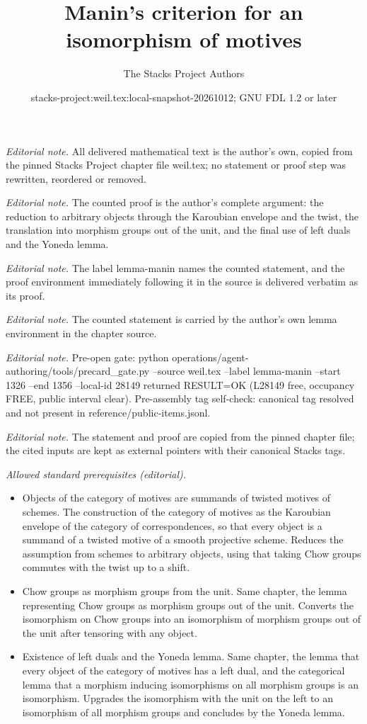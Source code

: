 \documentclass[10pt,a4paper]{amsart}
\title{Manin's criterion for an isomorphism of motives}
\author{The Stacks Project Authors}
\date{stacks-project:weil.tex:local-snapshot-20261012; GNU FDL 1.2 or later}
\theoremstyle{plain}
\theoremstyle{definition}
\theoremstyle{remark}
\numberwithin{equation}{subsection}
\begin{document}
\maketitle
\noindent\textit{Editorial note.} All delivered mathematical text is the author's own, copied from the pinned Stacks Project chapter file weil.tex; no statement or proof step was rewritten, reordered or removed.\par\medskip
\noindent\textit{Editorial note.} The counted proof is the author's complete argument: the reduction to arbitrary objects through the Karoubian envelope and the twist, the translation into morphism groups out of the unit, and the final use of left duals and the Yoneda lemma.\par\medskip
\noindent\textit{Editorial note.} The label lemma-manin names the counted statement, and the proof environment immediately following it in the source is delivered verbatim as its proof.\par\medskip
\noindent\textit{Editorial note.} The counted statement is carried by the author's own lemma environment in the chapter source.\par\medskip
\noindent\textit{Editorial note.} Pre-open gate: python operations/agent-authoring/tools/precard\_gate.py --source weil.tex --label lemma-manin --start 1326 --end 1356 --local-id 28149 returned RESULT=OK (L28149 free, occupancy FREE, public interval clear). Pre-assembly tag self-check: canonical tag resolved and not present in reference/public-items.jsonl.\par\medskip
\noindent\textit{Editorial note.} The statement and proof are copied from the pinned chapter file; the cited inputs are kept as external pointers with their canonical Stacks tags.\par\medskip
\noindent\textit{Allowed standard prerequisites (editorial).}\begin{itemize}
\item Objects of the category of motives are summands of twisted motives of schemes. The construction of the category of motives as the Karoubian envelope of the category of correspondences, so that every object is a summand of a twisted motive of a smooth projective scheme. Reduces the assumption from schemes to arbitrary objects, using that taking Chow groups commutes with the twist up to a shift.
\item Chow groups as morphism groups from the unit. Same chapter, the lemma representing Chow groups as morphism groups out of the unit. Converts the isomorphism on Chow groups into an isomorphism of morphism groups out of the unit after tensoring with any object.
\item Existence of left duals and the Yoneda lemma. Same chapter, the lemma that every object of the category of motives has a left dual, and the categorical lemma that a morphism inducing isomorphisms on all morphism groups is an isomorphism. Upgrades the isomorphism with the unit on the left to an isomorphism of all morphism groups and concludes by the Yoneda lemma.
\end{itemize}\medskip
\end{document}

